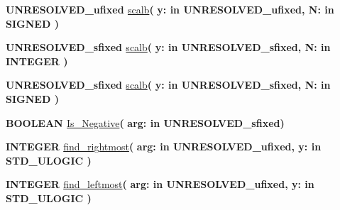\begin{DoxyCompactItemize}
\item 
{\bfseries {\bfseries \textcolor{vhdlchar}{U\+N\+R\+E\+S\+O\+L\+V\+E\+D\+\_\+ufixed}\textcolor{vhdlchar}{ }}} \hyperlink{class__fixed__pkg_a991487fdeca1541f633acc7ebb85598b}{scalb}{\bfseries  ( }{\bfseries \textcolor{vhdlchar}{y\+: }\textcolor{stringliteral}{in }\textcolor{vhdlchar}{U\+N\+R\+E\+S\+O\+L\+V\+E\+D\+\_\+ufixed}}{\bfseries  , \textcolor{vhdlchar}{N\+: }\textcolor{stringliteral}{in }{\bfseries \textcolor{comment}{S\+I\+G\+N\+E\+D}\textcolor{vhdlchar}{ }}}{\bfseries  )} 
\item 
{\bfseries {\bfseries \textcolor{vhdlchar}{U\+N\+R\+E\+S\+O\+L\+V\+E\+D\+\_\+sfixed}\textcolor{vhdlchar}{ }}} \hyperlink{class__fixed__pkg_a3b0a3ce1dfacad6ea0446802d2f6aad7}{scalb}{\bfseries  ( }{\bfseries \textcolor{vhdlchar}{y\+: }\textcolor{stringliteral}{in }\textcolor{vhdlchar}{U\+N\+R\+E\+S\+O\+L\+V\+E\+D\+\_\+sfixed}}{\bfseries  , \textcolor{vhdlchar}{N\+: }\textcolor{stringliteral}{in }{\bfseries \textcolor{comment}{I\+N\+T\+E\+G\+E\+R}\textcolor{vhdlchar}{ }}}{\bfseries  )} 
\item 
{\bfseries {\bfseries \textcolor{vhdlchar}{U\+N\+R\+E\+S\+O\+L\+V\+E\+D\+\_\+sfixed}\textcolor{vhdlchar}{ }}} \hyperlink{class__fixed__pkg_a3b0a3ce1dfacad6ea0446802d2f6aad7}{scalb}{\bfseries  ( }{\bfseries \textcolor{vhdlchar}{y\+: }\textcolor{stringliteral}{in }\textcolor{vhdlchar}{U\+N\+R\+E\+S\+O\+L\+V\+E\+D\+\_\+sfixed}}{\bfseries  , \textcolor{vhdlchar}{N\+: }\textcolor{stringliteral}{in }{\bfseries \textcolor{comment}{S\+I\+G\+N\+E\+D}\textcolor{vhdlchar}{ }}}{\bfseries  )} 
\item 
{\bfseries {\bfseries \textcolor{comment}{B\+O\+O\+L\+E\+A\+N}\textcolor{vhdlchar}{ }}} \hyperlink{class__fixed__pkg_ad2d7b0b5140709f3c6df16e8e32acaa9}{Is\+\_\+\+Negative}{\bfseries  ( }{\bfseries \textcolor{vhdlchar}{arg\+: }\textcolor{stringliteral}{in }\textcolor{vhdlchar}{U\+N\+R\+E\+S\+O\+L\+V\+E\+D\+\_\+sfixed}}{\bfseries  )} 
\item 
{\bfseries {\bfseries \textcolor{comment}{I\+N\+T\+E\+G\+E\+R}\textcolor{vhdlchar}{ }}} \hyperlink{class__fixed__pkg_a5993175faa64790646b397a112b9124a}{find\+\_\+rightmost}{\bfseries  ( }{\bfseries \textcolor{vhdlchar}{arg\+: }\textcolor{stringliteral}{in }\textcolor{vhdlchar}{U\+N\+R\+E\+S\+O\+L\+V\+E\+D\+\_\+ufixed}}{\bfseries  , \textcolor{vhdlchar}{y\+: }\textcolor{stringliteral}{in }{\bfseries \textcolor{comment}{S\+T\+D\+\_\+\+U\+L\+O\+G\+I\+C}\textcolor{vhdlchar}{ }}}{\bfseries  )} 
\item 
{\bfseries {\bfseries \textcolor{comment}{I\+N\+T\+E\+G\+E\+R}\textcolor{vhdlchar}{ }}} \hyperlink{class__fixed__pkg_a0dfcc29be0080b3406b8147cbcff18a6}{find\+\_\+leftmost}{\bfseries  ( }{\bfseries \textcolor{vhdlchar}{arg\+: }\textcolor{stringliteral}{in }\textcolor{vhdlchar}{U\+N\+R\+E\+S\+O\+L\+V\+E\+D\+\_\+ufixed}}{\bfseries  , \textcolor{vhdlchar}{y\+: }\textcolor{stringliteral}{in }{\bfseries \textcolor{comment}{S\+T\+D\+\_\+\+U\+L\+O\+G\+I\+C}\textcolor{vhdlchar}{ }}}{\bfseries  )} 

\end{DoxyCompactItemize}
